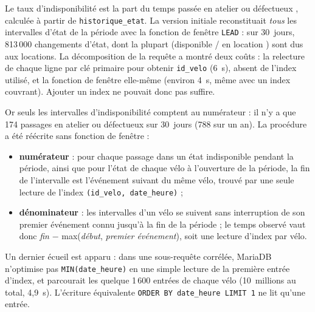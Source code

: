 Le taux d'indisponibilité est la part du temps passée \og en atelier \fg{} ou \og défectueux \fg{}, calculée à partir de \texttt{historique\_etat}. La version initiale reconstituait \emph{tous} les intervalles d'état de la période avec la fonction de fenêtre \texttt{LEAD} : sur 30~jours, 813\,000 changements d'état, dont la plupart (\og disponible \fg{} / \og en location \fg{}) sont dus aux locations. La décomposition de la requête a montré deux coûts : la relecture de chaque ligne par clé primaire pour obtenir \texttt{id\_velo} (6~s), absent de l'index utilisé, et la fonction de fenêtre elle-même (environ 4~s, même avec un index couvrant). Ajouter un index ne pouvait donc pas suffire.

Or seuls les intervalles d'indisponibilité comptent au numérateur : il n'y a que 174 passages en atelier ou défectueux sur 30~jours (788 sur un an). La procédure a été réécrite sans fonction de fenêtre :
\begin{itemize}
	\item \textbf{numérateur} : pour chaque passage dans un état indisponible pendant la période, ainsi que pour l'état de chaque vélo à l'ouverture de la période, la fin de l'intervalle est l'événement suivant du même vélo, trouvé par une seule lecture de l'index \texttt{(id\_velo, date\_heure)} ;
	\item \textbf{dénominateur} : les intervalles d'un vélo se suivent sans interruption de son premier événement connu jusqu'à la fin de la période ; le temps observé vaut donc \textit{fin} $-$ max(\textit{début}, \textit{premier événement}), soit une lecture d'index par vélo.
\end{itemize}

Un dernier écueil est apparu : dans une sous-requête corrélée, MariaDB n'optimise pas \texttt{MIN(date\_heure)} en une simple lecture de la première entrée d'index, et parcourait les quelque 1\,600 entrées de chaque vélo (10~millions au total, 4,9~s). L'écriture équivalente \texttt{ORDER BY date\_heure LIMIT 1} ne lit qu'une entrée.

